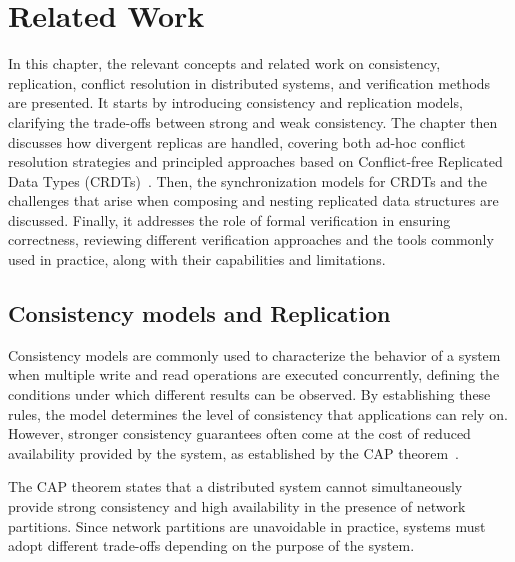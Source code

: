 
%

\chapter{Related Work}
\label{cha:related_work}

In this chapter, the relevant concepts and related work on consistency, replication, conflict resolution in distributed systems, and verification methods are presented. It starts by introducing consistency and replication models, clarifying the trade-offs between strong and weak consistency. The chapter then discusses how divergent replicas are handled, covering both ad-hoc conflict resolution strategies and principled approaches based on Conflict-free Replicated Data Types (CRDTs)~\cite{preguica2018overview}. Then, the synchronization models for CRDTs and the challenges that arise when composing and nesting replicated data structures are discussed. Finally, it addresses the role of formal verification in ensuring correctness, reviewing different verification approaches and the tools commonly used in practice, along with their capabilities and limitations.

\glsresetall

\section{Consistency models and Replication}
\label{sec:consistency}

Consistency models are commonly used to characterize the behavior of a system when multiple write and read operations are executed concurrently, defining the conditions under which different results can be observed. By establishing these rules, the model determines the level of consistency that applications can rely on. However, stronger consistency guarantees often come at the cost of reduced availability provided by the system, as established by the CAP theorem~\cite{cap-theorem}.

The CAP theorem states that a distributed system cannot simultaneously provide strong consistency and high availability in the presence of network partitions. Since network partitions are unavoidable in practice, systems must adopt different trade-offs depending on the purpose of the system.

